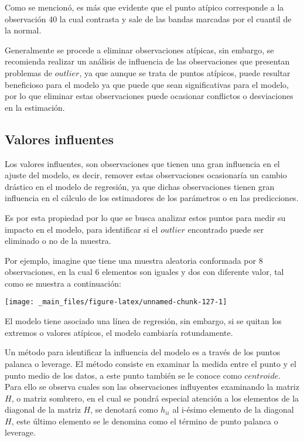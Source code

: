 \documentclass[
  a4paper,
  oneside,
  openany]{book}
\begin{document}
Como se mencionó, es más que evidente que el punto atípico corresponde a la observación 40 la cual contrasta y sale de las bandas marcadas por el cuantil de la normal.

Generalmente se procede a eliminar observaciones atípicas, sin embargo, se recomienda realizar un análisis de influencia de las observaciones que presentan problemas de \(outlier\), ya que aunque se trata de puntos atípicos, puede resultar beneficioso para el modelo ya que puede que sean significativas para el modelo, por lo que eliminar estas observaciones puede ocasionar conflictos o desviaciones en la estimación.

\hypertarget{valores-influentes}{%
\subsection{Valores influentes}\label{valores-influentes}}

Los valores influentes, son observaciones que tienen una gran influencia en el ajuste del modelo, es decir, remover estas observaciones ocasionaría un cambio drástico en el modelo de regresión, ya que dichas observaciones tienen gran influencia en el cálculo de los estimadores de los parámetros o en las predicciones.

Es por esta propiedad por lo que se busca analizar estos puntos para medir su impacto en el modelo, para identificar si el \(outlier\) encontrado puede ser eliminado o no de la muestra.

Por ejemplo, imagine que tiene una muestra aleatoria conformada por 8 observaciones, en la cual 6 elementos son iguales y dos con diferente valor, tal como se muestra a continuación:

\begin{center}\texttt{[image: \_main\_files/figure-latex/unnamed-chunk-127-1]} \end{center}

El modelo tiene asociado una línea de regresión, sin embargo, si se quitan los extremos o valores atípicos, el modelo cambiaría rotundamente.

Un método para identificar la influencia del modelo es a través de los puntos palanca o leverage. El método consiste en examinar la medida entre el punto y el punto medio de los datos, a este punto también se le conoce como \(centroide\). Para ello se observa cuales son las observaciones influyentes examinando la matriz \(H\), o matriz sombrero, en el cual se pondrá especial atención a los elementos de la diagonal de la matriz \(H\), se denotará como \(h_{ii}\) al i-ésimo elemento de la diagonal \(H\), este último elemento se le denomina como el término de punto palanca o leverage.
\end{document}
